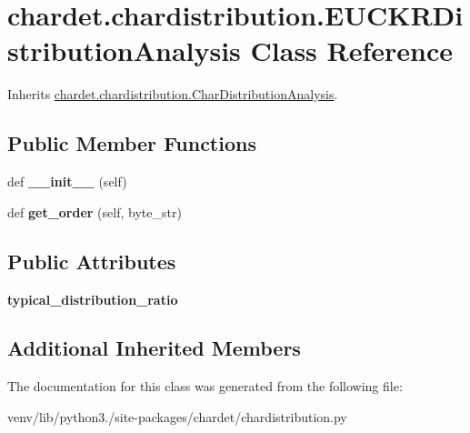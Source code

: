 \hypertarget{classchardet_1_1chardistribution_1_1_e_u_c_k_r_distribution_analysis}{}\section{chardet.\+chardistribution.\+E\+U\+C\+K\+R\+Distribution\+Analysis Class Reference}
\label{classchardet_1_1chardistribution_1_1_e_u_c_k_r_distribution_analysis}


Inherits \hyperlink{classchardet_1_1chardistribution_1_1_char_distribution_analysis}{chardet.\+chardistribution.\+Char\+Distribution\+Analysis}.

\subsection*{Public Member Functions}
\begin{DoxyCompactItemize}
\item 
\mbox{\label{classchardet_1_1chardistribution_1_1_e_u_c_k_r_distribution_analysis_ab3ed6d48d01f8cc4f9afec5b33307bb2}} 
def {\bfseries \+\_\+\+\_\+init\+\_\+\+\_\+} (self)
\item 
\mbox{\label{classchardet_1_1chardistribution_1_1_e_u_c_k_r_distribution_analysis_ace39092a0aa537edcc6e1bd648f37d49}} 
def {\bfseries get\+\_\+order} (self, byte\+\_\+str)
\end{DoxyCompactItemize}
\subsection*{Public Attributes}
\begin{DoxyCompactItemize}
\item 
\mbox{\label{classchardet_1_1chardistribution_1_1_e_u_c_k_r_distribution_analysis_a0267230364cc32dcf8cc47511114ca35}} 
{\bfseries typical\+\_\+distribution\+\_\+ratio}
\end{DoxyCompactItemize}
\subsection*{Additional Inherited Members}


The documentation for this class was generated from the following file\+:\begin{DoxyCompactItemize}
\item 
venv/lib/python3./site-\/packages/chardet/chardistribution.\+py\end{DoxyCompactItemize}
